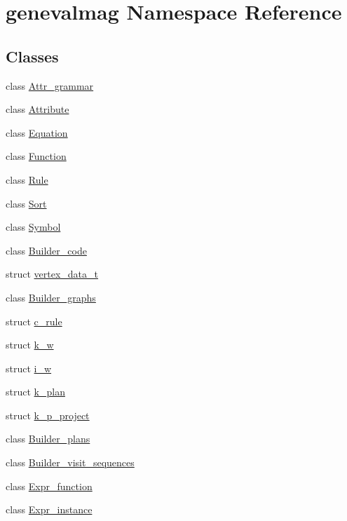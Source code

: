 \hypertarget{namespacegenevalmag}{
\section{genevalmag Namespace Reference}
\label{namespacegenevalmag}
}
\subsection*{Classes}
\begin{DoxyCompactItemize}
\item 
class \hyperlink{classgenevalmag_1_1Attr__grammar}{Attr\_\-grammar}
\item 
class \hyperlink{classgenevalmag_1_1Attribute}{Attribute}
\item 
class \hyperlink{classgenevalmag_1_1Equation}{Equation}
\item 
class \hyperlink{classgenevalmag_1_1Function}{Function}
\item 
class \hyperlink{classgenevalmag_1_1Rule}{Rule}
\item 
class \hyperlink{classgenevalmag_1_1Sort}{Sort}
\item 
class \hyperlink{classgenevalmag_1_1Symbol}{Symbol}
\item 
class \hyperlink{classgenevalmag_1_1Builder__code}{Builder\_\-code}
\item 
struct \hyperlink{structgenevalmag_1_1vertex__data__t}{vertex\_\-data\_\-t}
\item 
class \hyperlink{classgenevalmag_1_1Builder__graphs}{Builder\_\-graphs}
\item 
struct \hyperlink{structgenevalmag_1_1c__rule}{c\_\-rule}
\item 
struct \hyperlink{structgenevalmag_1_1k__w}{k\_\-w}
\item 
struct \hyperlink{structgenevalmag_1_1i__w}{i\_\-w}
\item 
struct \hyperlink{structgenevalmag_1_1k__plan}{k\_\-plan}
\item 
struct \hyperlink{structgenevalmag_1_1k__p__project}{k\_\-p\_\-project}
\item 
class \hyperlink{classgenevalmag_1_1Builder__plans}{Builder\_\-plans}
\item 
class \hyperlink{classgenevalmag_1_1Builder__visit__sequences}{Builder\_\-visit\_\-sequences}
\item 
class \hyperlink{classgenevalmag_1_1Expr__function}{Expr\_\-function}
\item 
class \hyperlink{classgenevalmag_1_1Expr__instance}{Expr\_\-instance}

\end{DoxyCompactItemize}
